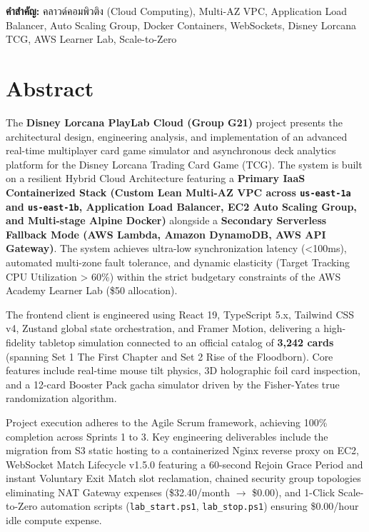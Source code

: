 \documentclass[12pt,a4paper]{report}
\begin{document}
\vspace{0.6cm}
\noindent \textbf{คำสำคัญ:} คลาวด์คอมพิวติง (Cloud Computing), Multi-AZ VPC, Application Load Balancer, Auto Scaling Group, Docker Containers, WebSockets, Disney Lorcana TCG, AWS Learner Lab, Scale-to-Zero

\newpage

\chapter*{Abstract}

The \textbf{Disney Lorcana PlayLab Cloud (Group G21)} project presents the architectural design, engineering analysis, and implementation of an advanced real-time multiplayer card game simulator and asynchronous deck analytics platform for the Disney Lorcana Trading Card Game (TCG). The system is built on a resilient Hybrid Cloud Architecture featuring a \textbf{Primary IaaS Containerized Stack (Custom Lean Multi-AZ VPC across \texttt{us-east-1a} and \texttt{us-east-1b}, Application Load Balancer, EC2 Auto Scaling Group, and Multi-stage Alpine Docker)} alongside a \textbf{Secondary Serverless Fallback Mode (AWS Lambda, Amazon DynamoDB, AWS API Gateway)}. The system achieves ultra-low synchronization latency (<100ms), automated multi-zone fault tolerance, and dynamic elasticity (Target Tracking CPU Utilization > 60\%) within the strict budgetary constraints of the AWS Academy Learner Lab (\$50 allocation).

The frontend client is engineered using React 19, TypeScript 5.x, Tailwind CSS v4, Zustand global state orchestration, and Framer Motion, delivering a high-fidelity tabletop simulation connected to an official catalog of \textbf{3,242 cards} (spanning Set 1 The First Chapter and Set 2 Rise of the Floodborn). Core features include real-time mouse tilt physics, 3D holographic foil card inspection, and a 12-card Booster Pack gacha simulator driven by the Fisher-Yates true randomization algorithm.

Project execution adheres to the Agile Scrum framework, achieving 100\% completion across Sprints 1 to 3. Key engineering deliverables include the migration from S3 static hosting to a containerized Nginx reverse proxy on EC2, WebSocket Match Lifecycle v1.5.0 featuring a 60-second Rejoin Grace Period and instant Voluntary Exit Match slot reclamation, chained security group topologies eliminating NAT Gateway expenses (\$32.40/month $\rightarrow$ \$0.00), and 1-Click Scale-to-Zero automation scripts (\texttt{lab\_start.ps1}, \texttt{lab\_stop.ps1}) ensuring \$0.00/hour idle compute expense.
\end{document}
